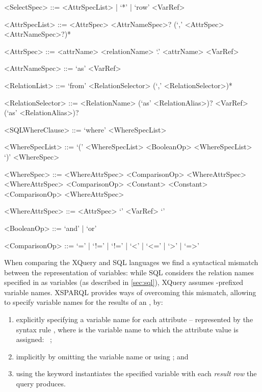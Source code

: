 {\scriptsize
  \begin{grammar}
    <SelectSpec>      ::=  <AttrSpecList> | `*'  | `row' <VarRef>

    <AttrSpecList>    ::=  <AttrSpec> <AttrNameSpec>? (`,' <AttrSpec> <AttrNameSpec>?)*

    <AttrSpec>        ::=       <attrName> 
                           \alt <relationName> `.' <attrName> 
                           \alt <VarRef> 

    <AttrNameSpec>    ::=  `as' <VarRef>

    <RelationList>    ::=  `from' <RelationSelector> (`,' <RelationSelector>)*

    <RelationSelector> ::=      <RelationName> (`as' <RelationAlias>)? 
                           \alt <VarRef> (`as' <RelationAlias>)?

    <SQLWhereClause>  ::=  `where' <WhereSpecList>

    <WhereSpecList>   ::=  `(' <WhereSpecList> <BooleanOp> <WhereSpecList> `)' 
                            \alt <WhereSpec> 

    <WhereSpec>       ::=        <WhereAttrSpec> <ComparisonOp> <WhereAttrSpec> 
                            \alt <WhereAttrSpec> <ComparisonOp> <Constant>
                            \alt <Constant> <ComparisonOp> <WhereAttrSpec>

    <WhereAttrSpec>   ::=        <AttrSpec> 
                            \alt `\textbraceleft' <VarRef> `\textbraceright'

    <BooleanOp>       ::=  `and' | `or'

    <ComparisonOp>    ::=  `=' | `!=' | `!=' | `<' | `<=' | `>' | `=>'
  \end{grammar}
}%
%
When comparing the XQuery and \ac{SQL} languages we find a syntactical mismatch between the representation
of variables: while \ac{SQL} considers the relation names specified in  as variables (as
described in \cref{sec:sql}), XQuery assumes \lit{\$}-prefixed variable names.
%
XSPARQL provides ways of overcoming this mismatch, allowing to specify variable names for the results of an
\SQLForClause, by:
%
\begin{enumerate}[label=(\roman*), noitemsep]
\item explicitly specifying a variable name for each attribute -- represented by the syntax rule ,
  where  is the variable name to which the attribute value is assigned: \eg~;
\item \label{forStar} implicitly by omitting the variable name or using \lit{\FOR *}; and
\item \label{forRow} using the  keyword instantiates the specified variable with each \emph{result row} the
  query produces.
\end{enumerate}
